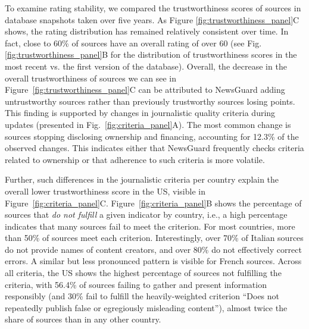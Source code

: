 \documentclass{article}
\begin{document}
To examine rating stability, we compared the trustworthiness scores of sources in database snapshots taken over five years. 
As Figure \ref{fig:trustworthiness_panel}C shows, the rating distribution has remained relatively consistent over time.
In fact, close to 60\% of sources have an overall rating of over 60 (see Fig. \ref{fig:trustworthiness_panel}B for the distribution of trustworthiness scores in the most recent vs. the first version of the database).
Overall, the decrease in the overall trustworthiness of sources we can see in Figure~\ref{fig:trustworthiness_panel}C can be attributed to NewsGuard adding untrustworthy sources rather than previously trustworthy sources losing points. 
This finding is supported by changes in journalistic quality criteria during updates (presented in Fig.~\ref{fig:criteria_panel}A).
The most common change is sources stopping disclosing ownership and financing, accounting for 12.3\% of the observed changes.
This indicates either that NewsGuard frequently checks criteria related to ownership or that adherence to such criteria is more volatile. 

Further, such differences in the journalistic criteria per country explain the overall lower trustworthiness score in the US, visible in Figure~\ref{fig:criteria_panel}C.
Figure~\ref{fig:criteria_panel}B shows the percentage of sources that \emph{do not fulfill} a given indicator by country, i.e., a high percentage indicates that many sources fail to meet the criterion.
For most countries, more than 50\% of sources meet each criterion. 
Interestingly, over 70\% of Italian sources do not provide names of content creators, and over 80\% do not effectively correct errors. 
A similar but less pronounced pattern is visible for French sources. 
Across all criteria, the US shows the highest percentage of sources not fulfilling the criteria, with 56.4\% of sources failing to gather and present information responsibly (and 30\% fail to fulfill the heavily-weighted criterion ``Does not repeatedly publish false or egregiously misleading content''), almost twice the share of sources than in any other country.
\end{document}
